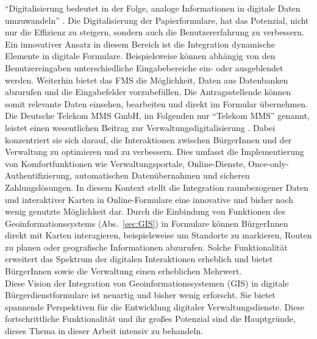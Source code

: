 ``Digitalisierung bedeutet in der Folge, analoge Informationen in digitale Daten umzuwandeln'' \cite[S.~90]{markus_auf_2022}. Die Digitalisierung der Papierformulare, hat das Potenzial, nicht nur die Effizienz zu steigern, sondern auch die Benutzererfahrung zu verbessern. Ein innovativer Ansatz in diesem Bereich ist die Integration dynamische Elemente in digitale Formulare. Beispielsweise können abhängig von den Benutzereingaben unterschiedliche Eingabebereiche ein- oder ausgeblendet werden. Weiterhin bietet das FMS die Möglichkeit, Daten aus Datenbanken abzurufen und die Eingabefelder vorzubefüllen. Die Antragsstellende können somit relevante Daten einsehen, bearbeiten und direkt im Formular übernehmen.\\

Die Deutsche Telekom MMS GmbH, im Folgenden nur ``Telekom MMS'' genannt, leistet einen wesentlichen Beitrag zur Verwaltungsdigitalisierung \citep{mms_moderne_verwaltung_2023}. Dabei konzentriert sie sich darauf, die Interaktionen zwischen BürgerInnen und der Verwaltung zu optimieren und zu verbessern. Dies umfasst die Implementierung von Komfortfunktionen wie Verwaltungsportale, Online-Dienste, Once-only-Authentifizierung, automatischen Datenübernahmen und sicheren Zahlungslösungen. In diesem Kontext stellt die Integration raumbezogener Daten und interaktiver Karten in Online-Formulare eine innovative und bisher noch wenig genutzte Möglichkeit dar. Durch die Einbindung von Funktionen des Geoinformationssystems (Abs.~\ref{sec:GIS}) in Formulare können BürgerInnen direkt mit Karten interagieren, beispielsweise um Standorte zu markieren, Routen zu planen oder geografische Informationen abzurufen. Solche Funktionalität erweitert das Spektrum der digitalen Interaktionen erheblich und bietet BürgerInnen sowie die Verwaltung einen erheblichen Mehrwert.\\

Diese Vision der Integration von Geoinformationssystemen (GIS) in digitale Bürgerdienstformulare ist neuartig und bisher wenig erforscht. Sie bietet spannende Perspektiven für die Entwicklung digitaler Verwaltungsdienste. Diese fortschrittliche Funktionalität und ihr großes Potenzial sind die Hauptgründe, dieses Thema in dieser Arbeit intensiv zu behandeln.